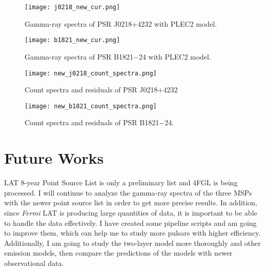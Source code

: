 \documentclass[a4paper, 12pt]{report}
\begin{document}
    \begin{figure}[!htp]
      \centering 
      \texttt{[image: j0218\_new\_cur.png]}
      \caption{Gamma-ray spectra of PSR J0218+4232 with PLEC2 model.}
      \label{fig: j0218_new_cur}
    \end{figure}

    \begin{figure}[!htp]
      \centering 
      \texttt{[image: b1821\_new\_cur.png]}
      \caption{Gamma-ray spectra of PSR B1821$-$24 with PLEC2 model.}
      \label{fig: b1821_new_cur}
    \end{figure}


    \begin{figure}[!htp]
      \centering 
      \texttt{[image: new\_j0218\_count\_spectra.png]}
      \caption{Count spectra and residuals of PSR J0218+4232}
      \label{fig: new_j0218_count_spectra}
    \end{figure}

    \begin{figure}[!htp]
      \centering 
      \texttt{[image: new\_b1821\_count\_spectra.png]}
      \caption{Count spectra and residuals of PSR B1821$-$24.}
      \label{fig: new_b1821_count_spectra}
    \end{figure}
    

    \section{Future Works}
      LAT 8-year Point Source List is only a preliminary list and 4FGL is being processed. 
      I will continue to analyze the gamma-ray spectra of the three MSPs with the 
      newer point source list in order to get more precise results. In addition, since 
      \textit{Fermi} LAT is producing large quantities of data, it is important to be able 
      to handle the data effectively. I have created some pipeline scripts and am going to
      improve them, which can help me to study more pulsars with higher efficiency.
      Additionally, I am going to study the two-layer model more thoroughly and other 
      emission models, then compare the predictions of the models with newer observational data.






\end{document}
